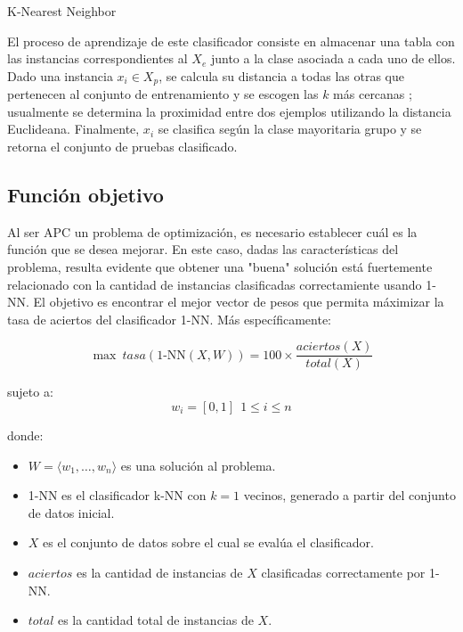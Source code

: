 \documentclass{ci5652}
\begin{document}
\begin{algorithm}
 \DontPrintSemicolon
 \vspace*{0.1cm}
 \vspace*{0.1cm}
 \caption{K-Nearest Neighbor}
\end{algorithm}

El proceso de aprendizaje de este clasificador consiste en almacenar una tabla
con las instancias correspondientes al $X_e$ junto a la clase asociada a cada
uno de ellos. Dado una instancia $x_i \in X_p$, se calcula su distancia a todas
las otras que pertenecen al conjunto de entrenamiento y se escogen las $k$ más
cercanas \cite{Herrera_2017}; usualmente se determina la proximidad entre dos
ejemplos utilizando la distancia Euclideana. Finalmente, $x_i$ se clasifica
según la clase mayoritaria grupo y se retorna el conjunto de pruebas clasificado.


\subsection{Función objetivo}

Al ser APC un problema de optimización, es necesario establecer cuál es la
función que se desea mejorar. En este caso, dadas las características del
problema, resulta evidente que obtener una "buena" solución está fuertemente
relacionado con la cantidad de instancias clasificadas correctamiente usando
1-NN. El objetivo es encontrar el mejor vector de pesos que permita máximizar la
tasa de aciertos del clasificador 1-NN. Más específicamente:

\begin{equation}
  \max\ tasa(\text{1-NN}(X, W)) = 100 \times \frac{aciertos(X)}{total(X)}
\end{equation}

sujeto a:
\[
w_i = [0, 1] \ \ 1 \leq i \leq n
\]

donde:
\begin{itemize}
  \item $W = \langle w_1, \dots, w_n\rangle$ es una solución al problema.
  \item 1-NN es el clasificador k-NN con $k=1$ vecinos, generado a partir del
  conjunto de datos inicial.
  \item $X$ es el conjunto de datos sobre el cual se evalúa el clasificador.
  \item $aciertos$ es la cantidad de instancias de $X$ clasificadas
  correctamente por 1-NN.
  \item $total$ es la cantidad total de instancias de $X$.
\end{itemize}
\end{document}
